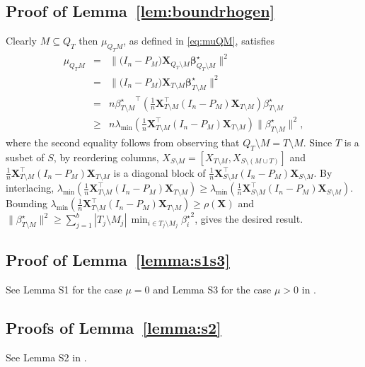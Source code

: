 \documentclass[aos]{imsart}
\theoremstyle{plain}
\newcommand{\bs}{\boldsymbol}
\begin{document}
\begin{supplement}
\subsection{Proof of Lemma~\ref{lem:boundrhogen}} 
Clearly $M \subseteq Q_T$ then $\mu_{Q_TM}$, as defined in \eqref{eq:muQM}, satisfies
\begin{eqnarray*}
    \mu_{Q_TM}&=&\|\big(I_n-P_M\big) \bs X_{Q_T\setminus M} \bs \beta^{\star}_{Q_T\setminus M}\|^2\\
    &=&\|\big(I_n-P_M\big) \bs X_{T\setminus M} \bs \beta^{\star}_{T\setminus M}\|^2\\
    &= & n {\beta^{\star}_{T\setminus M}}^\top \left(\tfrac1n \bs X_{T\setminus M}^\top(I_n-P_M)\bs X_{T\setminus M}\right)\beta^{\star}_{T\setminus M}\\
    &\geq & n\lambda_{\min}\left(\tfrac1n \bs X_{T\setminus M}^\top(I_n-P_M)\bs X_{T\setminus M}\right)\|\beta^{\star}_{T\setminus M}\|^2,
\end{eqnarray*}
where the second equality follows from observing that $Q_T\setminus M=T\setminus M$. Since $T$ is a susbet of $S$, by reordering columns, $X_{S\setminus M}=[X_{T\setminus M},X_{S\setminus (M\cup T)}]$ and $\tfrac1n \bs X_{T\setminus M}^\top(I_n-P_M)\bs X_{T\setminus M}$ is a diagonal block of $\tfrac1n \bs X_{S\setminus M}^\top(I_n-P_M)\bs X_{S\setminus M}$. By interlacing, $\lambda_{\min}\left(\tfrac1n \bs X_{T\setminus M}^\top(I_n-P_M)\bs X_{T\setminus M}\right) \geq \lambda_{\min}\left(\tfrac1n \bs X_{S\setminus M}^\top(I_n-P_M)\bs X_{S\setminus M}\right)$. Bounding 
$\lambda_{\min}\left(\tfrac1n \bs X_{T\setminus M}^\top(I_n-P_M)\bs X_{T\setminus M}\right) \geq \rho(\bs X)$ and $\|\beta^{\star}_{T\setminus M}\|^2\geq \sum_{j=1}^b|T_j\setminus M_j|\,\min_{i\in T_j\setminus M_j}{\beta_{i}^{\star}}^2$, gives the desired result.

\subsection{Proof of Lemma~\ref{lemma:s1s3}}

See Lemma S1 for the case $\mu=0$ and Lemma S3 for the case $\mu>0$ in \cite{rossell2022concentration}.

\subsection{Proofs of Lemma~\ref{lemma:s2}}
See Lemma S2 in \cite{rossell2022concentration}.




\end{supplement}
\end{document}
